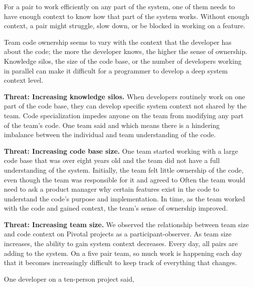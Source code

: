 For a pair to work efficiently on any part of the system, one of them needs to have enough context to know how that part of the system works. Without enough context, a pair might struggle, slow down, or be blocked in working on a feature.


Team code ownership seems to vary with the context that the developer has about the code; the more the developer knows, the higher the sense of ownership. Knowledge silos, the size of the code base, or the number of developers working in parallel can make it difficult for a programmer to develop a deep system context level.


\textbf{Threat: Increasing knowledge silos.} When developers routinely work on one part of the code base, they can develop specific system context not shared by the team. Code specialization impedes anyone on the team from modifying any part of the team's code.  One team said  and  which means there is a hindering imbalance between the individual and team understanding of the code.


\textbf{Threat: Increasing code base size.} One team started working with a large code base that was over eight years old and the team did not have a full understanding of the system. Initially, the team felt little ownership of the code, even though the team was responsible for it and agreed to  Often the team would need to ask a product manager why certain features exist in the code to understand the code's purpose and implementation. In time, as the team worked with the code and gained context, the team's sense of ownership improved.


\textbf{Threat: Increasing team size.} We observed the relationship between team size and code context on \numberOfObservedProjects{} Pivotal projects as a participant-observer. As team size increases, the ability to gain system context decreases. Every day, all pairs are adding to the system. On a five pair team, so much work is happening each day that it becomes increasingly difficult to keep track of everything that changes.


One developer on a ten-person project said, 


